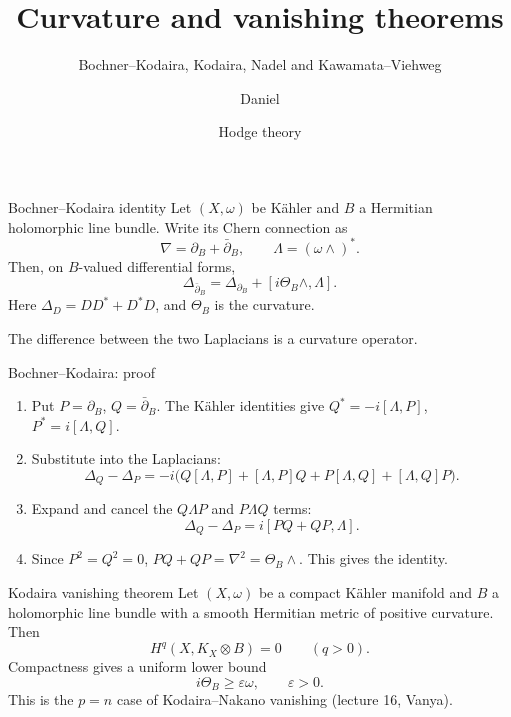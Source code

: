 \documentclass[aspectratio=169,11pt]{beamer}
\title{Curvature and vanishing theorems}
\subtitle{Bochner--Kodaira, Kodaira, Nadel and Kawamata--Viehweg}
\author{Daniel}
\date{Hodge theory}
\newcommand{\db}{\bar\partial}
\begin{document}
\begin{frame}
\titlepage
\end{frame}


\begin{frame}{Bochner--Kodaira identity}
Let \((X,\omega)\) be Kähler and \(B\) a Hermitian holomorphic line bundle.
Write its Chern connection as
\[
\nabla=\partial_B+\db_B,\qquad \Lambda=(\omega\wedge)^*.
\]
Then, on \(B\)-valued differential forms,
\[
\boxed{\Delta_{\db_B}=\Delta_{\partial_B}
+[i\Theta_B\wedge,\Lambda].}
\]
Here \(\Delta_D=DD^*+D^*D\), and \(\Theta_B\) is the curvature.
\medskip

The difference between the two Laplacians is a curvature operator.
\end{frame}

\begin{frame}{Bochner--Kodaira: proof}
\begin{enumerate}
\setlength{\itemsep}{8pt}
\item Put \(P=\partial_B\), \(Q=\db_B\).
The Kähler identities give
\(Q^*=-i[\Lambda,P]\), \(P^*=i[\Lambda,Q]\).
\item Substitute into the Laplacians:
\[
\Delta_Q-\Delta_P
=-i\bigl(Q[\Lambda,P]+[\Lambda,P]Q
+P[\Lambda,Q]+[\Lambda,Q]P\bigr).
\]
\item Expand and cancel the \(Q\Lambda P\) and \(P\Lambda Q\) terms:
\[
\Delta_Q-\Delta_P=i[PQ+QP,\Lambda].
\]
\item Since \(P^2=Q^2=0\),
\(PQ+QP=\nabla^2=\Theta_B\wedge\). This gives the identity.
\end{enumerate}
\end{frame}

\begin{frame}{Kodaira vanishing theorem}
Let \((X,\omega)\) be a compact Kähler manifold and \(B\)
a holomorphic line bundle with a smooth Hermitian metric of positive curvature.
Then
\[
\boxed{H^q(X,K_X\otimes B)=0\qquad(q>0).}
\]
\medskip
Compactness gives a uniform lower bound
\[
i\Theta_B\ge\varepsilon\omega,\qquad\varepsilon>0.
\]
This is the \(p=n\) case of Kodaira--Nakano vanishing (lecture 16, Vanya).
\end{frame}
\end{document}
